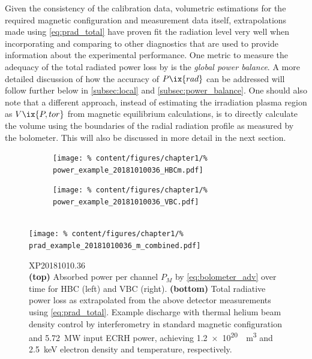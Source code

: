 %
            Given the consistency of the calibration data, volumetric estimations for the required magnetic configuration and measurement data itself, extrapolations made using \cref{eq:prad_total} have proven fit the radiation level very well when incorporating and comparing to other diagnostics that are used to provide information about the experimental performance. One metric to measure the adequacy of the total radiated power loss by is the \textit{global power balance}. A more detailed discussion of how the accuracy of $P\ix{rad}$ can be addressed will follow further below in \cref{subsec:local} and \cref{subsec:power_balance}. One should also note that a different approach, instead of estimating the irradiation plasma region as $V\ix{P, tor}$ from magnetic equilibrium calculations, is to directly calculate the volume using the boundaries of the radial radiation profile as measured by the bolometer. This will also be discussed in more detail in the next section.%
%
            \begin{figure}[t]%
                \centering%
                \begin{subfigure}{0.47\textwidth}%
                    \texttt{[image: \%
                        content/figures/chapter1/\%
                        power\_example\_20181010036\_HBCm.pdf]}%
                \end{subfigure}%
                \begin{subfigure}{0.47\textwidth}%
                    \texttt{[image: \%
                        content/figures/chapter1/\%
                        power\_example\_20181010036\_VBC.pdf]}%
                \end{subfigure}\\%
                \hspace*{-0.4cm}%
                \texttt{[image: \%
                    content/figures/chapter1/\%
                    prad\_example\_20181010036\_m\_combined.pdf]}%
                \caption{%
                    XP20181010.36\\%
                    \textbf{(top)} Absorbed power per channel $P_{M}$ by \cref{eq:bolometer_adv} over time for HBC (left) and VBC (right). \textbf{(bottom)} Total radiative power loss as extrapolated from the above detector measurements using \cref{eq:prad_total}. Example discharge with thermal helium beam density control by interferometry in standard magnetic configuration and \SI{5.72}{\mega\watt} input ECRH power, achieving \SI{1.2e20}{\per\cubic\meter} and \SI{2.5}{\kilo\electronvolt} electron density and temperature, respectively.}\label{fig:power_prad_ex}%
            \end{figure}%
%
